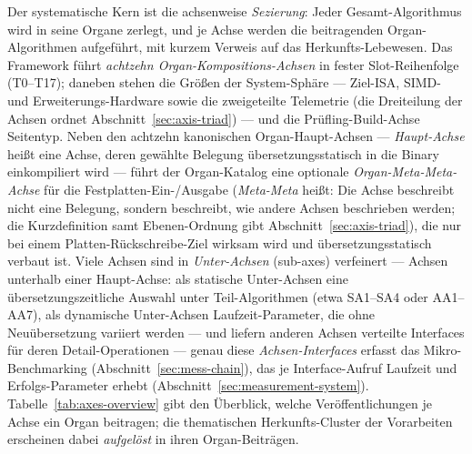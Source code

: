 \begin{nurlang}
Der systematische Kern ist die achsenweise \emph{Sezierung}: Jeder Gesamt-Algorithmus wird in seine Organe
zerlegt, und je Achse werden die beitragenden Organ-Algorithmen aufgeführt, mit kurzem Verweis auf das
Herkunfts-Lebewesen. Das Framework führt \emph{achtzehn Organ-Kompositions-Achsen} in fester
Slot-Reihenfolge (T0--T17); daneben stehen die Größen der System-Sphäre --- Ziel-ISA, SIMD- und
Erweiterungs-Hardware sowie die zweigeteilte Telemetrie (die Dreiteilung der Achsen ordnet
Abschnitt~\ref{sec:axis-triad}) --- und die Prüfling-Build-Achse Seitentyp. Neben den achtzehn
kanonischen Organ-Haupt-Achsen --- \emph{Haupt-Achse} heißt eine Achse, deren gewählte Belegung
übersetzungsstatisch in die Binary einkompiliert wird --- führt der Organ-Katalog eine optionale
\emph{Organ-Meta-Meta-Achse} für die Festplatten-Ein-/Ausgabe (\emph{Meta-Meta} heißt: Die Achse
beschreibt nicht eine Belegung, sondern beschreibt, wie andere Achsen beschrieben werden; die
Kurzdefinition samt Ebenen-Ordnung gibt Abschnitt~\ref{sec:axis-triad}), die nur bei einem
Platten-Rückschreibe-Ziel wirksam wird und übersetzungsstatisch verbaut ist. Viele Achsen sind in
\emph{Unter-Achsen} (sub-axes) verfeinert --- Achsen unterhalb einer Haupt-Achse: als statische
Unter-Achsen eine übersetzungszeitliche Auswahl unter Teil-Algorithmen (etwa SA1--SA4 oder AA1--AA7),
als dynamische Unter-Achsen Laufzeit-Parameter, die ohne Neuübersetzung variiert werden --- und liefern
anderen Achsen verteilte Interfaces für deren Detail-Operationen --- genau diese \emph{Achsen-Interfaces} erfasst das
Mikro-Benchmarking (Abschnitt~\ref{sec:mess-chain}), das je Interface-Aufruf Laufzeit und
Erfolgs-Parameter erhebt (Abschnitt~\ref{sec:measurement-system}).
Tabelle~\ref{tab:axes-overview} gibt den Überblick, welche Veröffentlichungen je Achse
ein Organ beitragen; die thematischen Herkunfts-Cluster der Vorarbeiten erscheinen dabei \emph{aufgelöst}
in ihren Organ-Beiträgen.
\end{nurlang}
